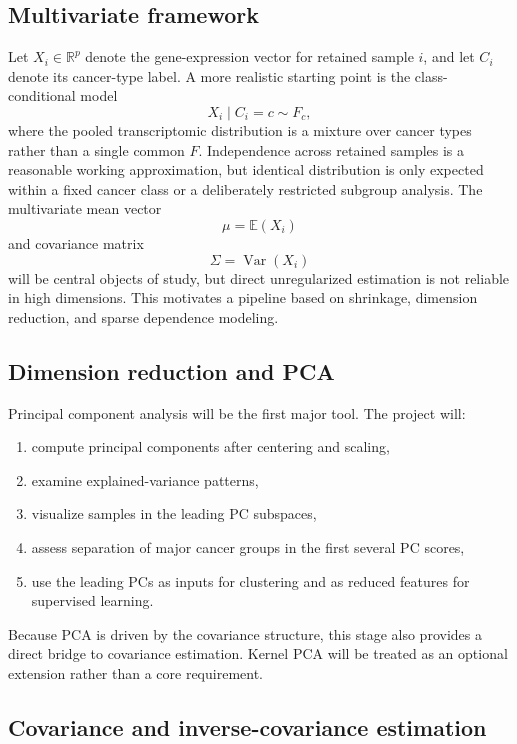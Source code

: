 \documentclass[12pt]{article}
\newcommand{\E}{\mathbb{E}}
\newcommand{\Var}{\operatorname{Var}}
\newcommand{\R}{\mathbb{R}}
\newcommand{\1}{\mathbf{1}}
\begin{document}
\subsection{Multivariate framework}

Let \(X_i \in \R^p\) denote the gene-expression vector for retained sample \(i\), and let \(C_i\) denote its cancer-type label. A more realistic starting point is the class-conditional model
\[
X_i \mid C_i = c \sim F_c,
\]
where the pooled transcriptomic distribution is a mixture over cancer types rather than a single common \(F\). Independence across retained samples is a reasonable working approximation, but identical distribution is only expected within a fixed cancer class or a deliberately restricted subgroup analysis. The multivariate mean vector
\[
\mu = \E(X_i)
\]
and covariance matrix
\[
\Sigma = \Var(X_i)
\]
will be central objects of study, but direct unregularized estimation is not reliable in high dimensions. This motivates a pipeline based on shrinkage, dimension reduction, and sparse dependence modeling.

\subsection{Dimension reduction and PCA}

Principal component analysis will be the first major tool. The project will:
\begin{enumerate}
    \item compute principal components after centering and scaling,
    \item examine explained-variance patterns,
    \item visualize samples in the leading PC subspaces,
    \item assess separation of major cancer groups in the first several PC scores,
    \item use the leading PCs as inputs for clustering and as reduced features for supervised learning.
\end{enumerate}

Because PCA is driven by the covariance structure, this stage also provides a direct bridge to covariance estimation. Kernel PCA will be treated as an optional extension rather than a core requirement.

\subsection{Covariance and inverse-covariance estimation}
\end{document}
